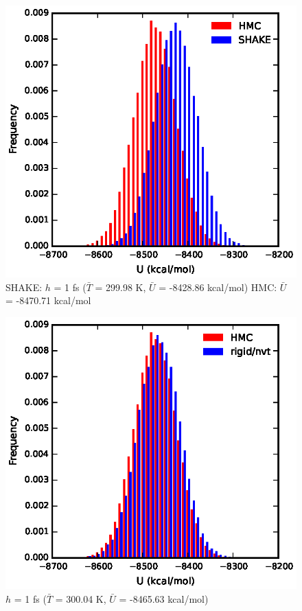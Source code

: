 \documentclass[journal=jctcce,manuscript=article,layout=twocolumn]{achemso}
\newcommand{\timestep}{h}
\begin{document}
\begin{figure}
    \caption{SHAKE: $\timestep$ = 1 fs ($\bar{T}$ = 299.98 K, $\bar{U}$ = -8428.86 kcal/mol) HMC: $\bar{U}$ = -8470.71 kcal/mol  }
	\includegraphics{potenergy}
\end{figure}

\begin{figure}
    \caption{$\timestep$ = 1 fs ($\bar{T}$ = 300.04 K, $\bar{U}$ = -8465.63 kcal/mol)}
	\includegraphics{potenergy2}
\end{figure}
\end{document}
